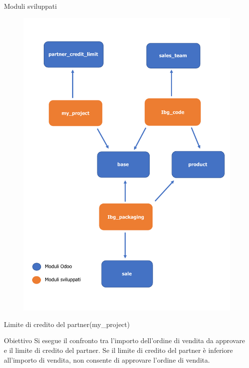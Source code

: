 \documentclass{beamer}
\begin{document}
\begin{frame}{Moduli sviluppati}

	\begin{figure}[H]
	\begin{center} \includegraphics[width=0.51\linewidth]{figures/diagramma}
	\end{center}
\end{figure}


\end{frame}

\begin{frame}{Limite di credito del partner\scriptsize{(my\_project)}}
	\vspace{.5em}
	\begin{alertblock}{Obiettivo}
	Si esegue il confronto tra l'importo dell'ordine di vendita da approvare e il limite di credito del partner. Se il limite di credito del partner è inferiore all'importo di vendita, non consente di approvare l'ordine di vendita.
	\end{alertblock}	


\end{frame}


%




%
\end{document}
